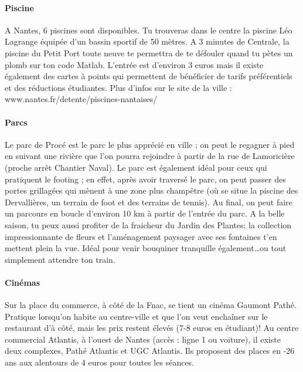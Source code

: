 \paragraph{Piscine}
A Nantes, 6 piscines sont disponibles.
Tu trouveras dans le centre la piscine Léo Lagrange équipée d'un bassin sportif de 50 mètres.
A 3 minutes de Centrale, la piscine du Petit Port toute neuve te permettra de te défouler quand tu pètes un plomb sur ton code Matlab.
L'entrée est d'environ 3 euros mais il existe également des cartes à points qui permettent de bénéficier de tarifs préférentiels et des réductions étudiantes.
Plus d'infos sur le site de la ville : www.nantes.fr/detente/piscines-nantaises/
\paragraph{Parcs}
Le parc de Procé est le parc le plus apprécié en ville ; on peut le regagner à pied en suivant une rivière que l'on pourra rejoindre à partir de la rue de Lamoricière (proche arrêt Chantier Naval).
Le parc est également idéal pour ceux qui pratiquent le footing ; en effet, après avoir traversé le parc, on peut passer des portes grillagées qui mènent à une zone plus champêtre (où se situe la piscine des Dervallières, un terrain de foot et des terrains de tennis).
Au final, on peut faire un parcours en boucle d'environ 10 km à partir de l'entrée du parc.
A la belle saison, tu peux aussi profiter de la fraicheur du Jardin des Plantes; la collection impressionnante de fleurs et l'aménagement paysager avec ses fontaines t'en mettent plein la vue.
Idéal pour venir bouquiner tranquille également\dots ou tout simplement attendre ton train.
\paragraph{Cinémas}
Sur la place du commerce, à côté de la Fnac, se tient un cinéma Gaumont Pathé.
Pratique lorsqu'on habite au centre-ville et que l'on veut enchaîner sur le restaurant d'à côté, mais les prix restent élevés (7-8 euros en étudiant)!
Au centre commercial Atlantis, à l'ouest de Nantes (accès : ligne 1 ou voiture), il existe deux complexes, Pathé Atlantis et UGC Atlantis.
Ils proposent des places en -26 ans aux alentours de 4 euros pour toutes les séances.

